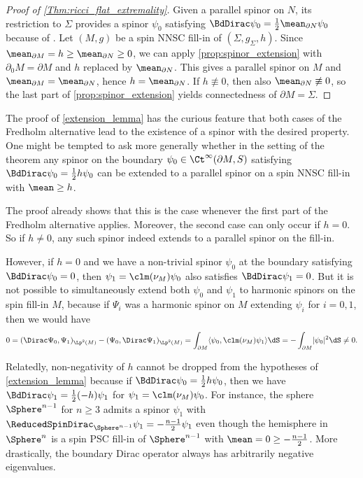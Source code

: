 \documentclass[a4paper,11pt]{amsart}
\numberwithin{equation}{section}
\begin{document}
\begin{proof}[Proof of \cref{Thm:ricci_flat_extremality}]
    Given a parallel spinor on \(N\), its restriction to \(\Sigma\) provides a spinor \(\psi_0\) satisfying \(\BdDirac \psi_0 = \frac{1}{2}\mean_{\partial N} \psi_0\) because of .
    Let \((M,g)\) be a spin NNSC fill-in of \((\Sigma, g_\Sigma,h)\). Since \(\mean_{\partial M}=h \geq \mean_{\partial N}\geq0\), we can apply \cref{prop:spinor_extension} with \(\partial_0M=\partial M\) and \(h\) replaced by \(\mean_{\partial N}\).
    This gives a parallel spinor on \(M\) and \(\mean_{\partial M}=\mean_{\partial N}\), hence \(h=\mean_{\partial N}\).
    If \(h\not\equiv0\), then also \(\mean_{\partial N}\not\equiv0\), so the last part of \cref{prop:spinor_extension} yields connectedness of \(\partial M=\Sigma\).
\end{proof}

\begin{remark}\label{remark:extendability_issue}
    The proof of \cref{extension_lemma} has the curious feature that both cases of the Fredholm alternative lead to the existence of a spinor with the desired property.
    One might be tempted to ask more generally whether in the setting of the theorem any spinor on the boundary \(\psi_0 \in \Ct^\infty(\partial M, S)\) satisfying \(\BdDirac \psi_0 = \frac{1}{2} h \psi_0\) can be extended to a parallel spinor on a spin NNSC fill-in with \(\mean \geq h\).
    
    The proof already shows that this is the case whenever the first part of the Fredholm alternative applies.
    Moreover, the second case can only occur if \(h = 0\).
    So if \(h \neq 0\), any such spinor indeed extends to a parallel spinor on the fill-in.
    
    However, if \(h = 0\) and we have a non-trivial spinor \(\psi_0\) at the boundary satisfying \(\BdDirac \psi_0 = 0\), then \(\psi_1 = \clm(\nu_M) \psi_0\) also satisfies \(\BdDirac \psi_1 = 0\).
    But it is not possible to simultaneously extend both \(\psi_0\) and \(\psi_1\) to harmonic spinors on the spin fill-in \(M\), because if \(\Psi_i\) was a harmonic spinor on \(M\) extending \(\psi_i\) for \(i = 0,1\), then we would have
    \[
        0 = (\Dirac \Psi_0, \Psi_1)_{\Lp^2(M)} - ( \Psi_0, \Dirac\Psi_1)_{\Lp^2(M)} = \int_{\partial M} \langle \psi_0, \clm(\nu_M) \psi_1 \rangle \dS = - \int_{\partial M} \lvert \psi_0 \rvert^2 \dS \neq 0.
    \]
    
    Relatedly, non-negativity of \(h\) cannot be dropped from the hypotheses of \cref{extension_lemma} because if \(\BdDirac \psi_0 = \frac{1}{2} h \psi_0\), then we have \(\BdDirac \psi_1 = \frac{1}{2} (-h) \psi_1\) for \(\psi_1 = \clm(\nu_M) \psi_0\).
    For instance, the sphere \(\Sphere^{n-1}\) for \(n \geq 3\) admits a spinor \(\psi_1\) with \(\ReducedSpinDirac_{\Sphere^{n-1}} \psi_1 = -\frac{n-1}{2} \psi_1\) even though the hemisphere in \(\Sphere^n\) is a spin PSC fill-in of \(\Sphere^{n-1}\) with \(\mean = 0 \geq - \frac{n-1}{2}\).
    More drastically, the boundary Dirac operator always has arbitrarily negative eigenvalues.
\end{remark}
\end{document}
